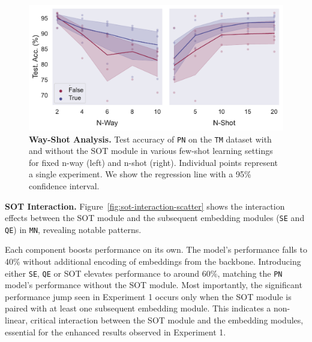\begin{figure}[h!]
    \centering
    \includegraphics[width=1\columnwidth]{../figures/way-shot.pdf}
    \caption{\textbf{Way-Shot Analysis.} Test accuracy of \texttt{PN} on the \texttt{TM} dataset with and without the SOT module in various few-shot learning settings for fixed n-way (left) and n-shot (right). Individual points represent a single experiment. We show the regression line with a 95\% confidence interval.}
    \label{fig:way-shot}
\end{figure}


\textbf{SOT Interaction.} Figure~\ref{fig:sot-interaction-scatter} shows the interaction effects between the SOT module and the subsequent embedding modules (\texttt{SE} and \texttt{QE}) in \texttt{MN}, revealing notable patterns.

Each component boosts performance on its own. The model's performance falls to 40\% without additional encoding of embeddings from the backbone. Introducing either \texttt{SE}, \texttt{QE} or SOT elevates performance to around 60\%, matching the \texttt{PN} model's performance without the SOT module. Most importantly, the significant performance jump seen in Experiment 1 occurs only when the SOT module is paired with at least one subsequent embedding module. This indicates a non-linear, critical interaction between the SOT module and the embedding modules, essential for the enhanced results observed in Experiment 1.

